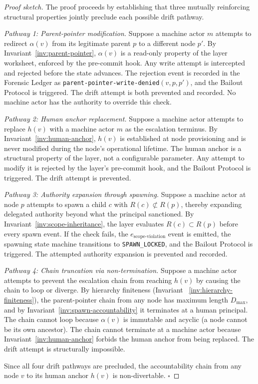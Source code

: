 \begin{proof}[Proof sketch]
The proof proceeds by establishing that three mutually reinforcing structural
properties jointly preclude each possible drift pathway.

\textit{Pathway 1: Parent-pointer modification.}  Suppose a machine actor $m$
attempts to redirect $\alpha(v)$ from its legitimate parent $p$ to a different
node $p'$.  By Invariant~\ref{inv:parent-pointer}, $\alpha(v)$ is a read-only
property of the \fact{} layer worksheet, enforced by the pre-commit hook.  Any
write attempt is intercepted and rejected before the state advances.  The rejection
event is recorded in the Forensic Ledger as
\texttt{parent-pointer-write-denied}$(v, p, p')$, and the Bailout Protocol is
triggered.  The drift attempt is both prevented and recorded.  No machine actor
has the authority to override this check.

\textit{Pathway 2: Human anchor replacement.}  Suppose a machine actor attempts
to replace $h(v)$ with a machine actor $m$ as the escalation terminus.  By
Invariant~\ref{inv:human-anchor}, $h(v)$ is established at node provisioning and
is never modified during the node's operational lifetime.  The human anchor is a
structural property of the \purpose{} layer, not a configurable parameter.  Any
attempt to modify it is rejected by the \fact{} layer's pre-commit hook, and the
Bailout Protocol is triggered.  The drift attempt is prevented.

\textit{Pathway 3: Authority expansion through spawning.}  Suppose a machine
actor at node $p$ attempts to spawn a child $c$ with $R(c) \not\subset R(p)$,
thereby expanding delegated authority beyond what the principal sanctioned.  By
Invariant~\ref{inv:scope-inheritance}, the \bounds{} layer evaluates
$R(c) \subset R(p)$ before every spawn event.  If the check fails, the
$e_{\text{scope-violation}}$ event is emitted, the spawning state machine
transitions to \texttt{SPAWN\_LOCKED}, and the Bailout Protocol is triggered.
The attempted authority expansion is prevented and recorded.

\textit{Pathway 4: Chain truncation via non-termination.}  Suppose a machine
actor attempts to prevent the escalation chain from reaching $h(v)$ by causing
the chain to loop or diverge.  By hierarchy finiteness (Invariant
~\ref{inv:hierarchy-finiteness}), the parent-pointer chain from any node has
maximum length $D_{\max}$, and by Invariant~\ref{inv:spawn-accountability} it
terminates at a human principal.  The chain cannot loop because $\alpha(v)$ is
immutable and acyclic (a node cannot be its own ancestor).  The chain cannot
terminate at a machine actor because Invariant~\ref{inv:human-anchor} forbids
the human anchor from being replaced.  The drift attempt is structurally
impossible.

Since all four drift pathways are precluded, the accountability chain from any
node $v$ to its human anchor $h(v)$ is non-divertable.  $\square$
\end{proof}

